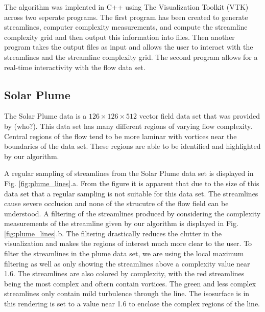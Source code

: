 \documentclass{egpubl}
\begin{document}
The algorithm was implented in C++ using The Visualization Toolkit (VTK) across two seperate programs.
The first program has been created to generate streamlines, computer complexity measurements, and compute the streamline complexity grid and then output this information into files.
Then another program takes the output files as input and allows the user to interact with the streamlines and the streamline complexity grid.
The second program allows for a real-time interactivity with the flow data set.

\subsection{Solar Plume}

The Solar Plume data is a $126 \times 126 \times 512$ vector field data set that was provided by (who?).
This data set has many different regions of varying flow complexity.
Central regions of the flow tend to be more laminar with vortices near the boundaries of the data set.
These regions are able to be identified and highlighted by our algorithm.

A regular sampling of streamlines from the Solar Plume data set is displayed in Fig. \ref{fig:plume_lines}.a.
From the figure it is apparent that due to the size of this data set that a regular sampling is not suitable for this data set.
The streamlines cause severe occlusion and none of the strucutre of the flow field can be understood.
A filtering of the streamlines produced by considering the complexity measurements of the streamline given by our algorithm is displayed in Fig. \ref{fig:plume_lines}.b.
The filtering drastically reduces the clutter in the visualization and makes the regions of interest much more clear to the user.
To filter the streamlines in the plume data set, we are using the local maximum filtering as well as only showing the streamlines above a complexity value near 1.6.
The streamlines are also colored by complexity, with the red streamlines being the most complex and oftern contain vortices.
The green and less complex streamlines only contain mild turbulence through the line.
The isosurface is in this rendering is set to a value near 1.6 to enclose the complex regions of the line.
\end{document}
